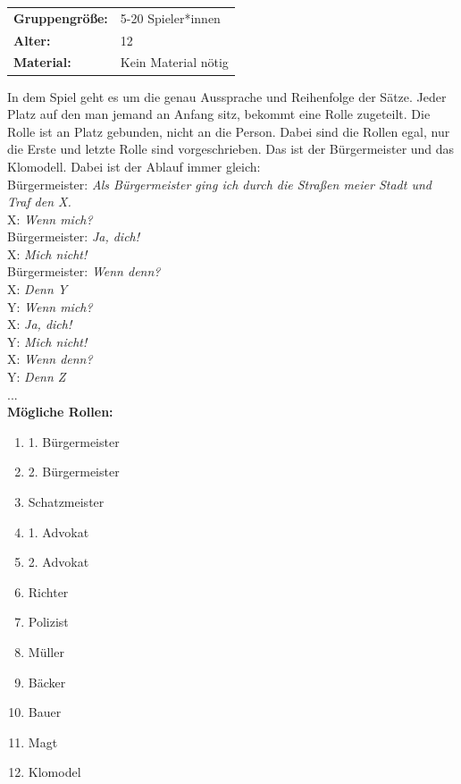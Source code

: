 \begin{table}[H]
\begin{tabular}{>{\bfseries}lp{8cm}}
   Gruppengröße:   & 5-20 Spieler*innen\\
    Alter: & 12 \\
    Material: & Kein Material nötig \\ 
\end{tabular}
\end{table}
In dem Spiel geht es um die genau Aussprache und Reihenfolge der Sätze. Jeder Platz auf den man jemand an Anfang sitz, bekommt eine Rolle zugeteilt. Die Rolle ist an Platz gebunden, nicht an die Person. Dabei sind die Rollen egal, nur die Erste und letzte Rolle sind vorgeschrieben. Das ist der Bürgermeister und das Klomodell. Dabei ist der Ablauf immer gleich: \\
Bürgermeister: \textit{Als Bürgermeister ging ich durch die Straßen meier Stadt und Traf den X.}\\
X: \textit{Wenn mich?}\\
Bürgermeister: \textit{Ja, dich!}\\
X: \textit{Mich nicht!}\\
Bürgermeister: \textit{Wenn denn?}\\
X: \textit{Denn Y}\\
Y: \textit{Wenn mich?}\\
X: \textit{Ja, dich!}\\
Y: \textit{Mich nicht!}\\
X: \textit{Wenn denn?}\\
Y: \textit{Denn Z}\\ 
...\\ \newline
\textbf{Mögliche Rollen:}\\
\begin{enumerate}
    \item 1. Bürgermeister
    \item 2. Bürgermeister
    \item Schatzmeister
    \item 1. Advokat
    \item 2. Advokat
    \item Richter
    \item Polizist
    \item Müller
    \item Bäcker
    \item Bauer
    \item Magt
    \item Klomodel
\end{enumerate}
